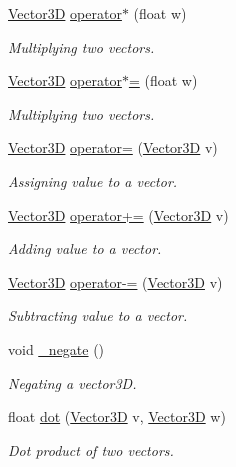 \begin{DoxyCompactItemize}
\hyperlink{classVector3D}{\-Vector3\-D} \hyperlink{classVector3D_ae27ebd79408dda5ea934537f3e3a8a79}{operator$\ast$} (float w)
\begin{DoxyCompactList}\small\item\em \-Multiplying two vectors. \end{DoxyCompactList}\item 
\hyperlink{classVector3D}{\-Vector3\-D} \hyperlink{classVector3D_aed6aa1fdfbded57c7ef9550056335b5e}{operator$\ast$=} (float w)
\begin{DoxyCompactList}\small\item\em \-Multiplying two vectors. \end{DoxyCompactList}\item 
\hyperlink{classVector3D}{\-Vector3\-D} \hyperlink{classVector3D_a32f869492a5f4180da56efeb6305d809}{operator=} (\hyperlink{classVector3D}{\-Vector3\-D} v)
\begin{DoxyCompactList}\small\item\em \-Assigning value to a vector. \end{DoxyCompactList}\item 
\hyperlink{classVector3D}{\-Vector3\-D} \hyperlink{classVector3D_aba789db92d17aa88be414bfc7e97b206}{operator+=} (\hyperlink{classVector3D}{\-Vector3\-D} v)
\begin{DoxyCompactList}\small\item\em \-Adding value to a vector. \end{DoxyCompactList}\item 
\hyperlink{classVector3D}{\-Vector3\-D} \hyperlink{classVector3D_aa18628bf690c9d7435cf4a153f0e7866}{operator-\/=} (\hyperlink{classVector3D}{\-Vector3\-D} v)
\begin{DoxyCompactList}\small\item\em \-Subtracting value to a vector. \end{DoxyCompactList}\item 
void \hyperlink{classVector3D_a58207b1d93269497dd0c5260860dcf1d}{\-\_\-negate} ()
\begin{DoxyCompactList}\small\item\em \-Negating a vector3\-D. \end{DoxyCompactList}\item 
float \hyperlink{classVector3D_ae32abd9c90473a1267c61df5f9091fa3}{dot} (\hyperlink{classVector3D}{\-Vector3\-D} v, \hyperlink{classVector3D}{\-Vector3\-D} w)
\begin{DoxyCompactList}\small\item\em \-Dot product of two vectors. \end{DoxyCompactList}\item 

\end{DoxyCompactItemize}
